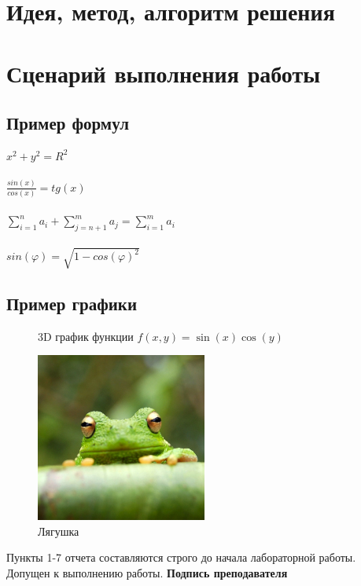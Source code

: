 \documentclass[12pt, letterpaper]{article}
\begin{document}
\section{Идея, метод, алгоритм решения}

\section{Сценарий выполнения работы}
\subsection{Пример формул}

$x^{2}+y^{2}=R^2$\\
\\
$\frac{sin(x)}{cos(x)}=tg(x)$\\
\\
$\sum^n_{i=1}a_i+\sum^m_{j=n+1}a_j=\sum^m_{i=1}a_i$\\
\\
$sin(\varphi)=\sqrt{1-cos(\varphi)^2}$\\
\subsection{Пример графики}
\begin{figure}[H]
    \centering
    \caption{3D график функции $f(x,y) = \sin(x)\cos(y)$}
\end{figure}
\begin{figure}[H]
\centering
\includegraphics[width=0.5\textwidth]{frog.jpg}
\caption{\label{fig:frog}Лягушка}
\end{figure}
Пункты 1-7 отчета составляются строго до начала лабораторной работы. Допущен к выполнению работы.
\textbf{Подпись преподавателя}
\end{document}
